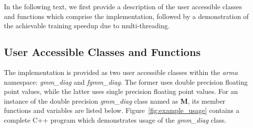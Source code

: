 In the following text, we first provide a description of the user accessible classes and functions which comprise the implementation,
followed by a demonstration of the achievable training speedup due to multi-threading.

\subsection{User Accessible Classes and Functions}

The implementation is provided as two user accessible classes within the {\it arma} namespace:
{\it gmm\_diag} and {\it fgmm\_diag}.
The former uses double precision floating point values, while the latter uses single precision floating point values.
For an instance of the double precision {\it gmm\_diag} class named as {\bf M},
its member functions and variables are listed below.
Figure~\ref{fig:example_usage} contains a complete C++ program which demonstrates usage of the {\it gmm\_diag} class.

